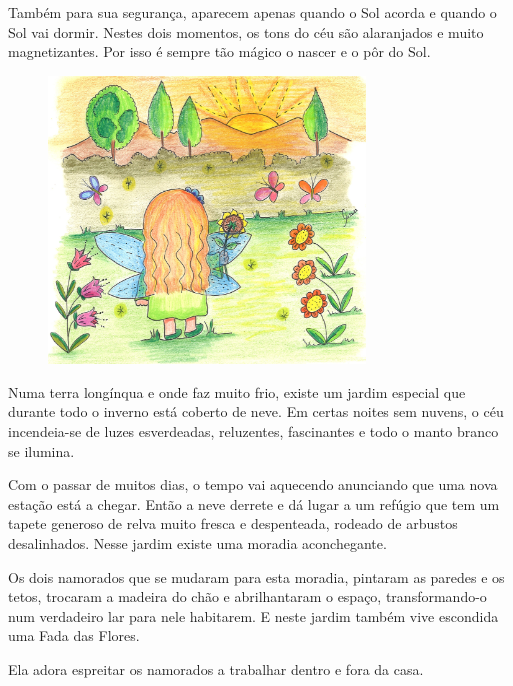 \documentclass[12pt, a4paper, twoside]{memoir}
\begin{document}
Também para sua segurança, aparecem apenas quando o Sol acorda e quando o Sol vai dormir. Nestes dois momentos, os tons do céu são alaranjados e muito magnetizantes. Por isso é sempre tão mágico o nascer e o pôr do Sol.

\begin{figure}[h]
    \centering
    \includegraphics[width=0.75\textwidth]{por_do_sol}
\end{figure}

Numa terra longínqua e onde faz muito frio, existe um jardim especial que durante todo o inverno está coberto de neve. Em certas noites sem nuvens, o céu incendeia-se de luzes esverdeadas, reluzentes, fascinantes e todo o manto branco se ilumina.

Com o passar de muitos dias, o tempo vai aquecendo anunciando que uma nova estação está a chegar. Então a neve derrete e dá lugar a um refúgio que tem um tapete generoso de relva muito fresca e despenteada, rodeado de arbustos desalinhados.
Nesse jardim existe uma moradia aconchegante.

Os dois namorados que se mudaram para esta moradia, pintaram as paredes e os tetos, trocaram a madeira do chão e abrilhantaram o espaço, transformando-o num verdadeiro lar para nele habitarem.
\bigbreak
E neste jardim também vive escondida uma Fada das Flores.

Ela adora espreitar os namorados a trabalhar dentro e fora da casa.
\end{document}
